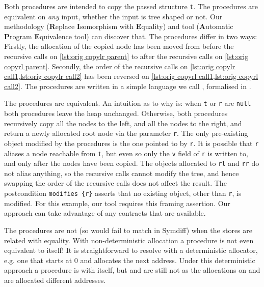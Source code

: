 \documentclass[runningheads,a4paper]{llncs}
\makeatletter
\newcommand*{\eg}{e.g.\@\xspace}
\makeatother
\begin{document}
\noindent
Both procedures are intended to copy the passed structure  \texttt{t}. The procedures are equivalent on \emph{any} input, whether the input is tree shaped or not. Our methodology \metho{} (\textbf{R}eplace \textbf{I}somorphism with \textbf{E}quality) and tool \tool{} (\textbf{A}utomatic \textbf{P}rogram \textbf{E}quivalence tool) can discover that. The procedures differ in two ways: Firstly, the allocation of the copied node has been moved from before the recursive calls on \cref{lst:orig copylr parent} to after the recursive calls on \cref{lst:orig copyrl parent}. Secondly, the order of the recursive calls on \cref{lst:orig copylr call1,lst:orig copylr call2} has been reversed on \cref{lst:orig copyrl call1,lst:orig copyrl call2}.   The procedures are written in a simple language we call \lang{}, formalised in .

The procedures are equivalent. An intuition as to why is: when \texttt{t} or \texttt{r} are \texttt{null} both procedures leave the heap unchanged. Otherwise, both procedures recursively copy all the nodes to the left, and all the nodes to the right, and return a newly allocated root node via the parameter \texttt{r}. The only pre-existing object modified by the procedures is the one pointed to by \texttt{r}. It is possible that \texttt{r} aliases a node reachable from \texttt{t}, but even so only the \texttt{v} field of \texttt{r} is written to, and only after the nodes have been copied. The objects allocated to \texttt{rl} and \texttt{rr} do not alias anything, so the recursive calls cannot modify the tree, and hence swapping the order of the recursive calls does not affect the result. The postcondition \texttt{modifies \{r\}} asserts that no existing object, other than \texttt{r}, is modified. For this example, our tool \tool{} requires this framing assertion. Our approach can take advantage of any contracts that are available.

The procedures are not \symdiffequiva{} (so would fail to match in Symdiff) when the stores are related with equality. With non-deterministic allocation a procedure is not even equivalent to itself! It is straightforward to resolve with a deterministic allocator, \eg one that starts at 0 and allocates the next address. Under this deterministic approach a procedure is \symdiffequiva{} with itself, but \copylr{} and \copyrl{} are still not \symdiffequiva{} as the allocations on  and  are allocated different addresses.
\end{document}
